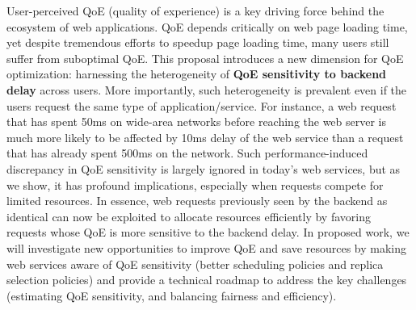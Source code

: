 User-perceived QoE (quality of experience) is a key driving force behind the ecosystem of web applications.
QoE depends critically on web page loading time, yet despite tremendous efforts to speedup page loading time,
many users still suffer from suboptimal QoE.
This proposal introduces a new dimension for QoE optimization: harnessing the heterogeneity of {\bf QoE sensitivity to backend delay} across users. More importantly, such heterogeneity is prevalent even if the users request the same type of application/service.
For instance, a web request that has spent 50ms on wide-area networks before reaching the web server is much more likely to be affected by 10ms delay of the web service than a request that has already spent 500ms on the network. 
Such performance-induced discrepancy in QoE sensitivity is largely ignored in today's web services, but as we show, it has profound implications, especially when requests compete for limited resources.
In essence, web requests previously seen by the backend as identical can now be exploited to allocate resources efficiently by favoring requests whose QoE is more sensitive to the backend delay.
In proposed work, we will investigate new opportunities to improve QoE and save resources by making web services aware of QoE sensitivity 
(\eg better scheduling policies and replica selection policies) and provide a technical roadmap to address the key challenges  (\eg estimating QoE sensitivity, and balancing fairness and efficiency).


